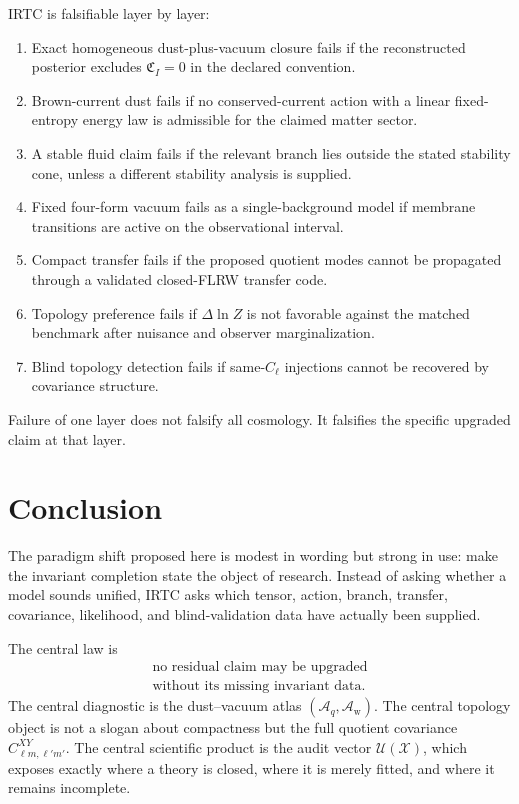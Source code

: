 \documentclass[
  aps,
  prd,
  reprint,
  superscriptaddress,
  floatfix,
  nofootinbib,
  longbibliography
]{revtex4-2}
\theoremstyle{plain}
\theoremstyle{definition}
\theoremstyle{remark}
\newcommand{\Aq}{\mathcal A_q}
\newcommand{\Aw}{\mathcal A_{\mathrm w}}
\newcommand{\Xcal}{\mathcal X}
\newcommand{\Ucal}{\mathcal U}
\begin{document}
IRTC is falsifiable layer by layer:
\begin{enumerate}
\item Exact homogeneous dust-plus-vacuum closure fails if the reconstructed posterior excludes $\mathfrak C_I=0$ in the declared convention.
\item Brown-current dust fails if no conserved-current action with a linear fixed-entropy energy law is admissible for the claimed matter sector.
\item A stable fluid claim fails if the relevant branch lies outside the stated stability cone, unless a different stability analysis is supplied.
\item Fixed four-form vacuum fails as a single-background model if membrane transitions are active on the observational interval.
\item Compact transfer fails if the proposed quotient modes cannot be propagated through a validated closed-FLRW transfer code.
\item Topology preference fails if $\Delta\ln Z$ is not favorable against the matched benchmark after nuisance and observer marginalization.
\item Blind topology detection fails if same-$C_\ell$ injections cannot be recovered by covariance structure.
\end{enumerate}
Failure of one layer does not falsify all cosmology.  It falsifies the specific upgraded claim at that layer.

\section{Conclusion}

The paradigm shift proposed here is modest in wording but strong in use: make the invariant completion state the object of research.  Instead of asking whether a model sounds unified, IRTC asks which tensor, action, branch, transfer, covariance, likelihood, and blind-validation data have actually been supplied.

The central law is
\begin{equation}
\boxed{
\begin{gathered}
\text{no residual claim may be upgraded}\\
\text{without its missing invariant data}.
\end{gathered}}
\end{equation}
The central diagnostic is the dust--vacuum atlas $(\Aq,\Aw)$.  The central topology object is not a slogan about compactness but the full quotient covariance $C_{\ell m,\ell'm'}^{XY}$.  The central scientific product is the audit vector $\Ucal(\Xcal)$, which exposes exactly where a theory is closed, where it is merely fitted, and where it remains incomplete.
\end{document}
